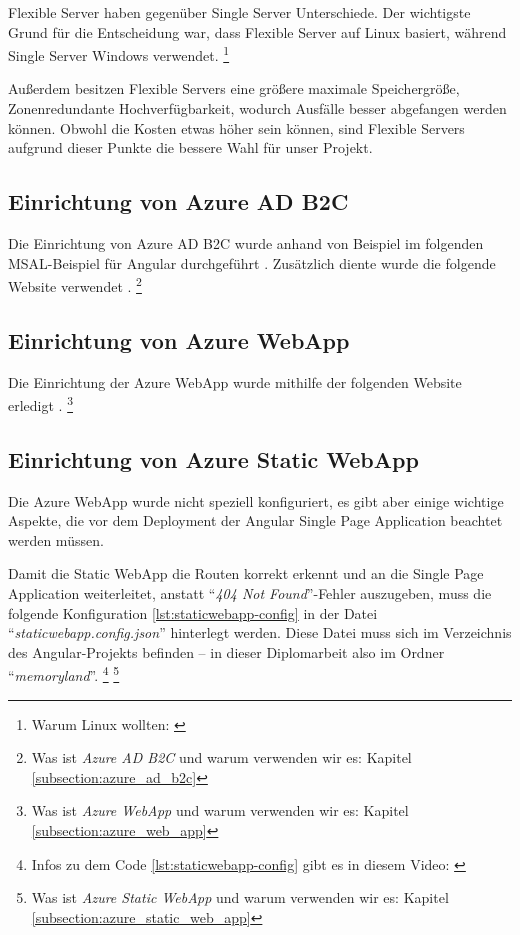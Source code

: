 Flexible Server haben gegenüber Single Server Unterschiede. 
Der wichtigste Grund für die Entscheidung war, dass Flexible Server auf Linux basiert, 
während Single Server Windows verwendet. \footnote{Warum Linux wollten: \cite{hussain2015survey}}

Au\ss{}erdem besitzen Flexible Servers eine grö\ss{}ere maximale Speichergrö\ss{}e, Zonenredundante Hochverfügbarkeit, 
wodurch Ausfälle besser abgefangen werden können. Obwohl die Kosten etwas höher sein können, 
sind Flexible Servers aufgrund dieser Punkte die bessere Wahl für unser Projekt.

\subsection{Einrichtung von Azure AD B2C}

Die Einrichtung von Azure AD B2C wurde anhand von Beispiel im folgenden MSAL-Beispiel
für Angular durchgeführt \cite{MicrosoftCorporationh}. Zusätzlich diente wurde die folgende
Website verwendet \cite{MicrosoftCorporationg}.
\footnote{Was ist \emph{Azure AD B2C} und warum verwenden wir es: Kapitel \ref{subsection:azure_ad_b2c}}

\subsection{Einrichtung von Azure WebApp}

Die Einrichtung der Azure WebApp wurde mithilfe der folgenden Website erledigt 
\cite{MicrosoftCorporationi}.
\footnote{Was ist \emph{Azure WebApp} und warum verwenden wir es: Kapitel \ref{subsection:azure_web_app}}


\subsection{Einrichtung von Azure Static WebApp}

Die Azure WebApp wurde nicht speziell konfiguriert, es gibt aber einige wichtige Aspekte, 
die vor dem Deployment der Angular Single Page Application beachtet werden müssen.  

Damit die Static WebApp die Routen korrekt erkennt und an die Single Page Application 
weiterleitet, anstatt ``\emph{404 Not Found}''-Fehler auszugeben, muss die folgende 
Konfiguration \ref{lst:staticwebapp-config} in der Datei ``\emph{staticwebapp.config.json}'' hinterlegt werden. 
Diese Datei muss sich im Verzeichnis des Angular-Projekts befinden -- in dieser Diplomarbeit
also im Ordner ``\emph{memoryland}''. \footnote{Infos zu dem Code \ref{lst:staticwebapp-config} gibt es in diesem Video: \cite{MicrosoftCorporationj}}
\footnote{Was ist \emph{Azure Static WebApp} und warum verwenden wir es: Kapitel \ref{subsection:azure_static_web_app}}

